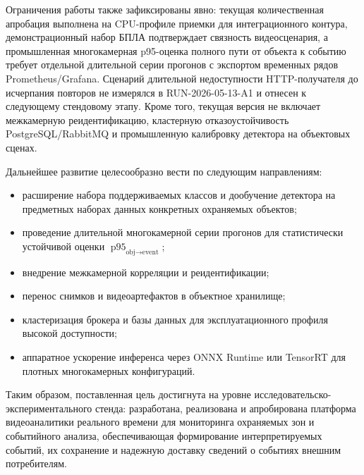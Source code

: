 Ограничения работы также зафиксированы явно: текущая количественная апробация выполнена на CPU-профиле приемки для интеграционного контура, демонстрационный набор БПЛА подтверждает связность видеосценария, а промышленная многокамерная p95-оценка полного пути от объекта к событию требует отдельной длительной серии прогонов с экспортом временных рядов Prometheus/Grafana. Сценарий длительной недоступности HTTP-получателя до исчерпания повторов не измерялся в RUN-2026-05-13-A1 и отнесен к следующему стендовому этапу. Кроме того, текущая версия не включает межкамерную реидентификацию, кластерную отказоустойчивость PostgreSQL/RabbitMQ и промышленную калибровку детектора на объектовых сценах.

Дальнейшее развитие целесообразно вести по следующим направлениям:
\begin{itemize}
    \item расширение набора поддерживаемых классов и дообучение детектора на предметных наборах данных конкретных охраняемых объектов;
    \item проведение длительной многокамерной серии прогонов для статистически устойчивой оценки \(\operatorname{p95}_{\text{obj}\to\text{event}}\);
    \item внедрение межкамерной корреляции и реидентификации;
    \item перенос снимков и видеоартефактов в объектное хранилище;
    \item кластеризация брокера и базы данных для эксплуатационного профиля высокой доступности;
    \item аппаратное ускорение инференса через ONNX Runtime или TensorRT для плотных многокамерных конфигураций.
\end{itemize}

Таким образом, поставленная цель достигнута на уровне исследовательско-экспериментального стенда: разработана, реализована и апробирована платформа видеоаналитики реального времени для мониторинга охраняемых зон и событийного анализа, обеспечивающая формирование интерпретируемых событий, их сохранение и надежную доставку сведений о событиях внешним потребителям.
